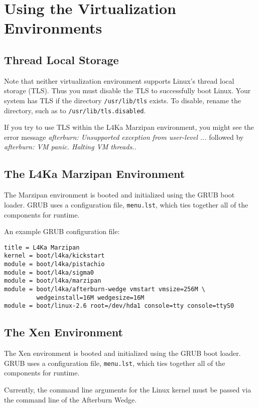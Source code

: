\documentclass[twoside,a4paper]{report}
\newcommand{\code}[1]{{\tt #1}}
\begin{document}
\chapter{Using the Virtualization Environments}

\section{Thread Local Storage}

Note that neither virtualization environment supports Linux's thread
local storage (TLS).  Thus you must disable the TLS to successfully
boot Linux.  Your system has TLS if the directory \code{/usr/lib/tls}
exists.  To disable, rename the directory, such as to
\code{/usr/lib/tls.disabled}.

If you try to use TLS within the L4Ka
Marzipan environment, you might see the error message \emph{afterburn:
Unsupported exception from user-level ...} followed by
\emph{afterburn: VM panic.  Halting VM threads.}. 

\section{The L4Ka Marzipan Environment}

The Marzipan environment is booted and initialized using the GRUB boot
loader.  GRUB uses a configuration file, \code{menu.lst}, which
ties together all of the components for runtime.

An example GRUB configuration file:
\begin{verbatim}
title = L4Ka Marzipan
kernel = boot/l4ka/kickstart
module = boot/l4ka/pistachio
module = boot/l4ka/sigma0
module = boot/l4ka/marzipan
module = boot/l4ka/afterburn-wedge vmstart vmsize=256M \
         wedgeinstall=16M wedgesize=16M
module = boot/linux-2.6 root=/dev/hda1 console=tty console=ttyS0
\end{verbatim}

\section{The Xen Environment}

The Xen environment is booted and initialized using the GRUB boot
loader.  GRUB uses a configuration file, \code{menu.lst}, which
ties together all of the components for runtime.

Currently, the command line arguments for the Linux kernel must be
passed via the command line of the Afterburn Wedge.
\end{document}
